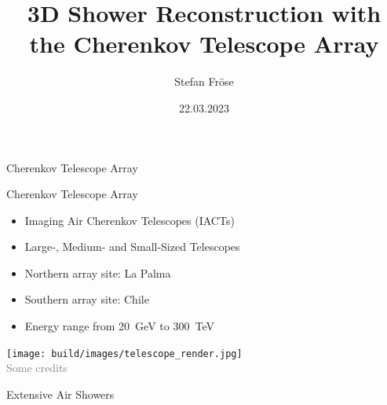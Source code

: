 \documentclass[aspectratio=1610, 9pt]{beamer}
\title{3D Shower Reconstruction with the Cherenkov Telescope Array}
\author[S.~Fröse]{Stefan Fröse}
\institute[WG Elsässer]{WG Elsässer \\  Faculty of Physics}
\date{22.03.2023}
\begin{document}
\maketitle

\begin{frame}
  \begin{center}
    \fontsize{40}{48} \selectfont\textcolor{tugreen}{Cherenkov Telescope Array}
  \end{center}
\end{frame}

\begin{frame}{Cherenkov Telescope Array}
    \begin{minipage}{0.49\textwidth}
        \begin{itemize}
            \item Imaging Air Cherenkov Telescopes (IACTs)
            \item Large-, Medium- and Small-Sized Telescopes
            \item Northern array site: La Palma
            \item Southern array site: Chile
            \item Energy range from \SI{20}{\GeV} to \SI{300}{\TeV}
        \end{itemize}
    \end{minipage}
    \hfill
    \begin{minipage}{0.5\textwidth}
        \centering
        \texttt{[image: build/images/telescope\_render.jpg]}\\
        \tiny{{\textcolor{gray}{Some credits}}}
    \end{minipage}
\end{frame}

\begin{frame}
  \begin{center}
    \fontsize{40}{48} \selectfont\textcolor{tugreen}{Extensive Air Showers}
  \end{center}
\end{frame}
\end{document}
